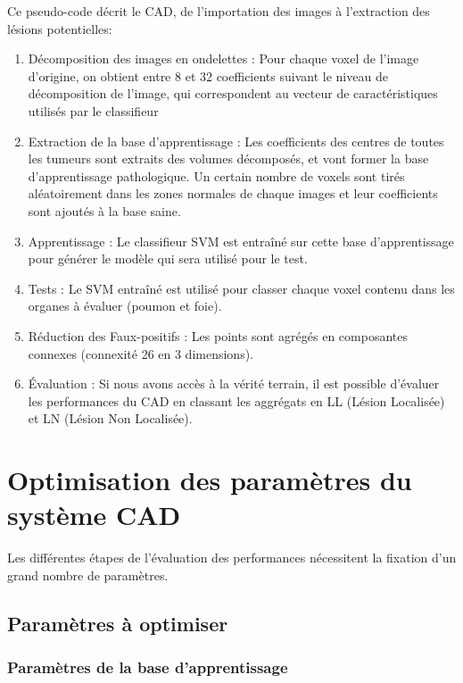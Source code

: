 Ce pseudo-code décrit le CAD, de l'importation des images à l'extraction des lésions potentielles:

\begin{enumerate}
 \item Décomposition des images en ondelettes : Pour chaque voxel de l'image d'origine, on obtient entre 8 et 32 coefficients suivant le niveau de décomposition de l'image, qui correspondent au vecteur de caractéristiques utilisés par le classifieur
 \item Extraction de la base d'apprentissage : Les coefficients des centres de toutes les tumeurs sont extraits des volumes décomposés, et vont former la base d'apprentissage pathologique. Un certain nombre de voxels sont tirés aléatoirement dans les zones normales de chaque images et leur coefficients sont ajoutés à la base saine.
 \item Apprentissage : Le classifieur SVM est entraîné sur cette base d'apprentissage pour générer le modèle qui sera utilisé pour le test.
 \item Tests : Le SVM entraîné est utilisé pour classer chaque voxel contenu dans les organes à évaluer (poumon et foie).
 \item Réduction des Faux-positifs : Les points sont agrégés en composantes connexes (connexité 26 en 3 dimensions).
 \item Évaluation : Si nous avons accès à la vérité terrain, il est possible d'évaluer les performances du CAD en classant les aggrégats en LL (Lésion Localisée) et LN (Lésion Non Localisée).
\end{enumerate}



\section{Optimisation des paramètres du système CAD} %
\label{lab:optim}

Les différentes étapes de l'évaluation des performances nécessitent la fixation d'un grand nombre de paramètres.

\subsection{Paramètres à optimiser} %


\subsubsection{Paramètres de la base d'apprentissage}

